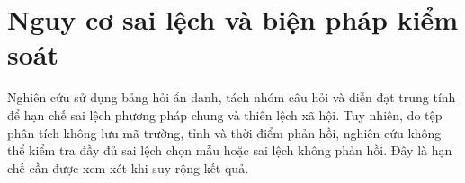 \section{Nguy cơ sai lệch và biện pháp kiểm soát}
Nghiên cứu sử dụng bảng hỏi ẩn danh, tách nhóm câu hỏi và diễn đạt trung tính để hạn chế sai lệch phương pháp chung và thiên lệch xã hội. Tuy nhiên, do tệp phân tích không lưu mã trường, tỉnh và thời điểm phản hồi, nghiên cứu không thể kiểm tra đầy đủ sai lệch chọn mẫu hoặc sai lệch không phản hồi. Đây là hạn chế cần được xem xét khi suy rộng kết quả.
